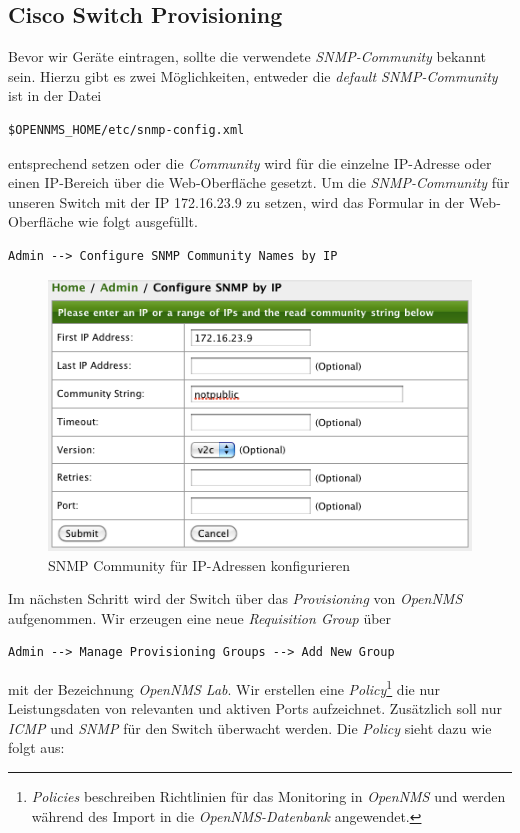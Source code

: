 \subsection{Cisco Switch Provisioning}
Bevor wir Geräte eintragen, sollte die verwendete \textit{SNMP-Community} bekannt sein. Hierzu gibt es zwei Möglichkeiten, entweder die \textit{default SNMP-Community} ist in der Datei
\begin{lstlisting}[numbers=none]
$OPENNMS_HOME/etc/snmp-config.xml
\end{lstlisting}
entsprechend setzen oder die \textit{Community} wird für die einzelne IP-Adresse oder einen IP-Bereich über die Web-Oberfläche gesetzt. Um die \textit{SNMP-Community} für unseren Switch mit der IP 172.16.23.9 zu setzen, wird das Formular in der Web-Oberfläche wie folgt ausgefüllt.
\begin{lstlisting}[numbers=none]
Admin --> Configure SNMP Community Names by IP
\end{lstlisting}
\begin{figure}[H]
	\centering
	\includegraphics[width=1.0\textwidth]{images/use-cases/monitoring-layer-2/configure-snmp-by-ip}
	\caption{SNMP Community für IP-Adressen konfigurieren}
	\label{pic:configure-snmp-by-ip}
\end{figure}
Im nächsten Schritt wird der Switch über das \textit{Provisioning} von \textit{OpenNMS} aufgenommen. Wir erzeugen eine neue \textit{Requisition Group} über 
\begin{lstlisting}[numbers=none]
Admin --> Manage Provisioning Groups --> Add New Group
\end{lstlisting}
mit der Bezeichnung \textit{OpenNMS Lab}. Wir erstellen eine \textit{Policy}\footnote{\textit{Policies} beschreiben Richtlinien für das Monitoring in \textit{OpenNMS} und werden während des Import in die \textit{OpenNMS-Datenbank} angewendet.} die nur Leistungsdaten von relevanten und aktiven Ports aufzeichnet. Zusätzlich soll nur \textit{ICMP} und \textit{SNMP} für den Switch überwacht werden. Die \textit{Policy} sieht dazu wie folgt aus:
